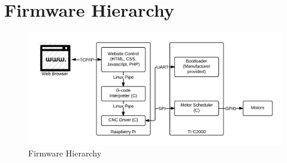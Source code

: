 \chapter{Firmware Hierarchy}

\begin{figure}[!ht]
	\centering
	\includegraphics[width=1\textwidth]{firmware-hierarchy.png}
	\caption{Firmware Hierarchy}
	\label{fig:firmware-hierarchy}
\end{figure}